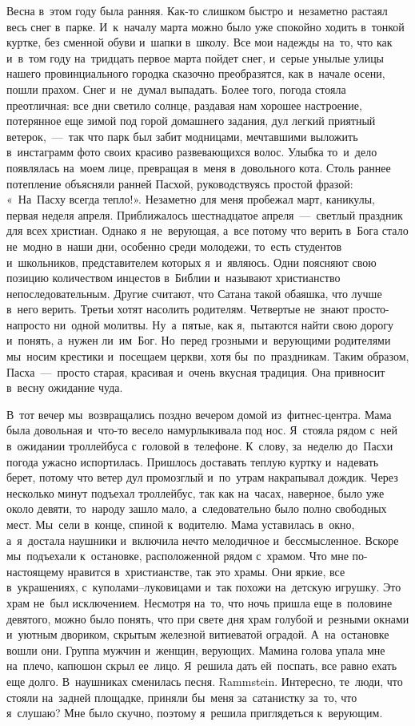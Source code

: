 
\lettrine[lines=3, loversize=0.1]{В}{}есна в~этом году была ранняя.
Как-то слишком быстро и~незаметно растаял весь снег в~парке.
И~к~началу марта можно было уже спокойно ходить в~тонкой куртке, без сменной обуви и~шапки в~школу.
Все мои надежды на~то, что как и~в~том году на~тридцать первое марта пойдет снег, и~серые унылые улицы нашего провинциального городка сказочно преобразятся, как в~начале осени, пошли прахом.
Снег и~не~думал выпадать.
Более того, погода стояла преотличная: все дни светило солнце, раздавая нам хорошее настроение, потерянное еще зимой под горой домашнего задания, дул легкий приятный ветерок,~---~так что парк был забит модницами, мечтавшими выложить в~инстаграмм фото своих красиво развевающихся волос.
Улыбка то~и~дело появлялась на~моем лице, превращая в~меня в~довольного кота.
Столь раннее потепление объясняли ранней Пасхой, руководствуясь простой фразой: «~На~Пасху всегда тепло!».
Незаметно для меня пробежал март, каникулы, первая неделя апреля.
Приближалось шестнадцатое апреля~---~светлый праздник для всех христиан.
Однако я~не~верующая, а~все потому что верить в~Бога стало не~модно в~наши дни, особенно среди молодежи, то~есть студентов и~школьников, представителем которых я~и~являюсь.
Одни поясняют свою позицию количеством инцестов в~Библии и~называют христианство непоследовательным.
Другие считают, что Сатана такой обаяшка, что лучше в~него верить.
Третьи хотят насолить родителям.
Четвертые не~знают просто-напросто ни~одной молитвы.
Ну~а~пятые, как я,~пытаются найти свою дорогу и~понять, а~нужен ли~им~Бог.
Но~перед грозными и~верующими родителями мы~носим крестики и~посещаем церкви, хотя бы~по~праздникам.
Таким образом, Пасха~---~просто старая, красивая и~очень вкусная традиция.
Она привносит в~весну ожидание чуда.
 
В~тот вечер мы~возвращались поздно вечером домой из~фитнес-центра.
Мама была довольная и~что-то весело намурлыкивала под нос.
Я~стояла рядом с~ней в~ожидании троллейбуса с~головой в~телефоне.
К~слову, за~неделю до~Пасхи погода ужасно испортилась.
Пришлось доставать теплую куртку и~надевать берет, потому что ветер дул промозглый и~по~утрам накрапывал дождик.
Через несколько минут подъехал троллейбус, так как на~часах, наверное, было уже около девяти, то~народу зашло мало, а~следовательно было полно свободных мест.
Мы~сели в~конце, спиной к~водителю.
Мама уставилась в~окно, а~я~достала наушники и~включила нечто мелодичное и~бессмысленное.
Вскоре мы~подъехали к~остановке, расположенной рядом с~храмом.
Что мне по-настоящему нравится в~христианстве, так это храмы.
Они яркие, все в~украшениях, с~куполами--луковицами и~так похожи на~детскую игрушку.
Это храм не~был исключением.
Несмотря на~то, что ночь пришла еще в~половине девятого, можно было понять, что при свете дня храм голубой и~резными окнами и~уютным двориком, скрытым железной витиеватой оградой.
А~на~остановке вошли они.
Группа мужчин и~женщин, верующих.
Мамина голова упала мне на~плечо, капюшон скрыл ее~лицо.
Я~решила дать ей~поспать, все равно ехать еще долго.
В~наушниках сменилась песня.
Rammstein.
Интересно, те~люди, что стояли на~задней площадке, приняли бы~меня за~сатанистку за~то, что я~слушаю? Мне было скучно, поэтому я~решила приглядеться к~верующим.


